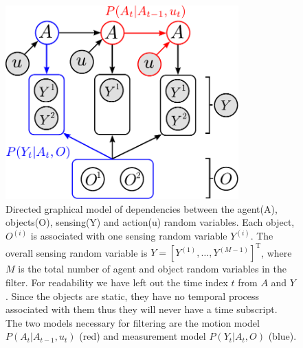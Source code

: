 \begin{figure}
\centering
\includegraphics[width=0.8\textwidth]{./ch5-MLMF/Figures/Figure2.pdf}
\caption{Directed graphical model of dependencies between the agent(A), objects(O), sensing(Y) and action(u) random variables. Each 
object, $O^{(i)}$ is associated with one sensing random variable $Y^{(i)}$. The overall sensing random variable is $Y = \left[Y^{(1)},\dots,Y^{(M-1)}\right]^{\mathrm{T}}$,
where $M$ is the total number of agent and object random variables in the filter. 
For readability we have left out the time index $t$ from $A$ and $Y$. Since the objects are static, they have no temporal process associated with 
them thus they will never have a time subscript. The two models necessary for filtering are the motion model $P(A_t|A_{t-1},u_t)$ (red) and measurement model
$P(Y_t|A_t,O)$ (blue).}
\label{fig:bayesian_sse_dag}
\end{figure}

